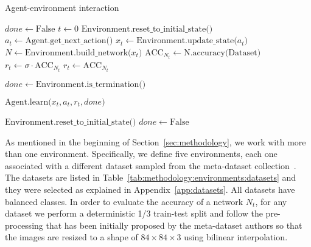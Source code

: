 \begin{algorithm}
\caption{Agent-environment interaction}\label{euclid}
\begin{algorithmic}[1]
    \State $done \gets \text{False}$
    \State $t \gets 0$
    \State $\text{Environment.reset\_to\_initial\_state()}$
        \State $a_t \gets \text{Agent.get\_next\_action()}$
        \State $x_t \gets \text{Environment.update\_state(}a_t\text{)}$
        \State $N \gets \text{Environment.build\_network(}x_t\text{)}$
        \State $\text{ACC}_{N_t} \gets \text{N.accuracy(Dataset)}$
            \State $r_t \gets \sigma \cdot \text{ACC}_{N_t}$ 
        \Else
            \State $r_t \gets \text{ACC}_{N_t}$ 
        \EndIf
        
        \State $done \gets \text{Environment.is\_termination()}$ \label{alg:methodology:rl:environments:interaction:termination}
        
        \State $\text{Agent.learn(}x_t, a_t, r_t, done\text{)}$
        
            \State $ \text{Environment.reset\_to\_initial\_state()}$
            \State $done \gets \text{False}$
        \EndIf
    \EndWhile
    \EndProcedure
    
\end{algorithmic}
\label{alg:methodology:rl:environments:interaction}
\end{algorithm}

As mentioned in the beginning of Section~\ref{sec:methodology}, we work with more than one environment. Specifically, we define five environments, each one associated with a different dataset sampled from the meta-dataset collection~\citep{MetaDataset}. The datasets are listed in Table~\ref{tab:methodology:environments:datasets} and they were selected as explained in Appendix~\ref{app:datasets}. All datasets have balanced classes. In order to evaluate the accuracy of a network $N_t$, for any dataset we perform a deterministic 1/3 train-test split and follow the pre-processing that has been initially proposed by the meta-dataset authors so that the images are resized to a shape of $84 \times 84 \times 3$ using bilinear interpolation. 

